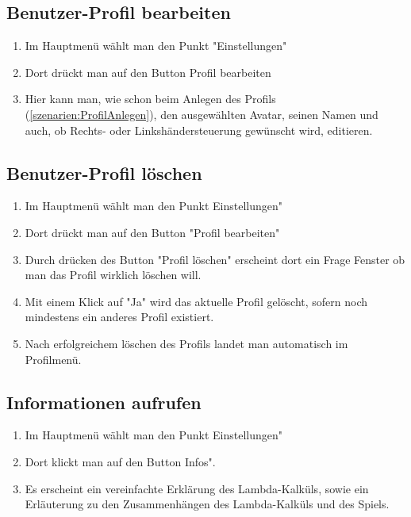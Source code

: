 \documentclass{scrartcl}
\begin{document}
\subsection{Benutzer-Profil bearbeiten} \label{szenarien:ProfilBearbeiten}
	\begin{enumerate}
		\item Im Hauptmenü wählt man den Punkt "Einstellungen"
		\item Dort drückt man auf den Button \glqq Profil bearbeiten\grqq
		\item Hier kann man, wie schon beim Anlegen des Profils (\ref{szenarien:ProfilAnlegen}), den ausgewählten Avatar, seinen Namen und auch, ob Rechts- oder Linkshändersteuerung gewünscht wird, editieren.
	\end{enumerate}
	
\subsection{Benutzer-Profil löschen} \label{szenarien:ProfilBearbeiten}
\begin{enumerate}
	\item Im Hauptmenü wählt man den Punkt \grqq Einstellungen"
	\item Dort drückt man auf den Button "Profil bearbeiten"
	\item Durch drücken des Button "Profil löschen" erscheint dort ein Frage Fenster ob man das Profil wirklich löschen will.
	\item Mit einem Klick auf "Ja" wird das aktuelle Profil gelöscht, sofern noch mindestens ein anderes Profil existiert.
	\item Nach erfolgreichem löschen des Profils landet man automatisch im Profilmenü.
\end{enumerate}

\subsection{Informationen aufrufen}
\begin{enumerate}
	\item Im Hauptmenü wählt man den Punkt \grqq Einstellungen"
	\item Dort klickt man auf den Button \grqq Infos".
	\item Es erscheint ein vereinfachte Erklärung des Lambda-Kalküls, sowie ein Erläuterung zu den Zusammenhängen des Lambda-Kalküls und des Spiels.
\end{enumerate}
\end{document}
